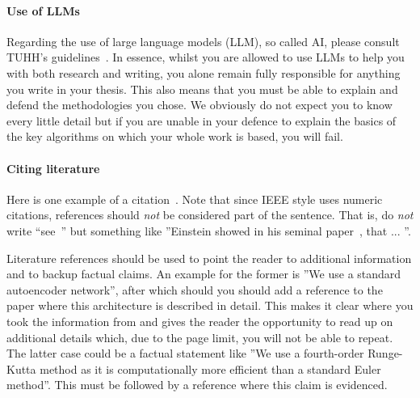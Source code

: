 \documentclass[conference]{IEEEtran}
\begin{document}
\paragraph{Use of LLMs}
Regarding the use of large language models (LLM), so called AI, please consult TUHH's guidelines~\cite{tuhh-ai}.
In essence, whilst you are allowed to use LLMs to help you with both research and writing, you alone remain fully responsible for anything you write in your thesis.
This also means that you must be able to explain and defend the methodologies you chose.
We obviously do not expect you to know every little detail but if you are unable in your defence to explain the basics of the key algorithms on which your whole work is based, you will fail.

\paragraph{Citing literature}
Here is one example of a citation~\cite{einstein1905}. 
Note that since IEEE style uses numeric citations, references should \emph{not} be considered part of the sentence.
That is, do \emph{not} write ``see~\cite{einstein1905}'' but something like ''Einstein showed in his seminal paper~\cite{einstein1905}, that ... ''.

Literature references should be used to point the reader to additional information and to backup factual claims.
An example for the former is ''We use a standard autoencoder network'', after which should you should add a reference to the paper where this architecture is described in detail.
This makes it clear where you took the information from and gives the reader the opportunity to read up on additional details which, due to the page limit, you will not be able to repeat.
The latter case could be a factual statement like ''We use a fourth-order Runge-Kutta method as it is computationally more efficient than a standard Euler method''.
This must be followed by a reference where this claim is evidenced.

\end{document}
